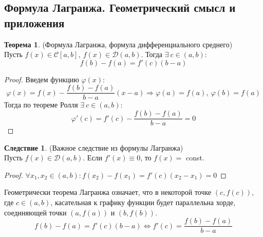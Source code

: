 \documentclass[a4paper, 12pt]{article}
\renewcommand{\phi}{\varphi}
\theoremstyle{definition}
\newtheorem*{theorem}{Теорема}
\newtheorem*{consequense}{Следствие}
\begin{document}
        \subsection{Формула Лагранжа. Геометрический смысл и приложения}
        \begin{theorem} (Формула Лагранжа, формула дифференциального среднего)\\
            Пусть $f(x)\in \mathcal{C}[a,b],\ f(x)\in \mathcal{D}(a,b)$. Тогда $\exists\ c\in (a,b):$
            \[f(b)-f(a)=f'(c)(b-a)\]
        \end{theorem}  
        \begin{proof}
            Введем функцию $\phi(x):$
            \[\phi(x)=f(x)-\frac{f(b)-f(a)}{b-a}(x-a)\Rightarrow \phi(a)=f(a),\ \phi(b)=f(a)\]
            Тогда по теореме Ролля $\exists\ c\in (a,b):$ 
            \[\phi'(c)=f'(c)-\frac{f(b)-f(a)}{b-a}=0\]
        \end{proof} 
        \begin{consequense} (Важное следствие из формулы Лагранжа)\\
            Пусть $f(x)\in \mathcal{D}(a,b)$. Если $f'(x)\equiv 0$, то $f(x)=$ \textrm{const}.
        \end{consequense} 
        \begin{proof}
            $\forall x_1,x_2\in(a,b): f(x_2)-f(x_1)=f'(c)(x_2-x_1)=0$
        \end{proof} 
        Геометрически теорема Лагранжа означает, что в некоторой точке $(c, f(c))$, где $c\in (a,b)$, касательная к графику функции будет параллельна хорде, соединяющей точки $(a,f(a))$ и $(b,f(b))$.
        \[f(b)-f(a)=f'(c)(b-a) \Leftrightarrow f'(c)=\frac{f(b)-f(a)}{b-a}\]
        \begin{center}
        \end{center}
\end{document}

